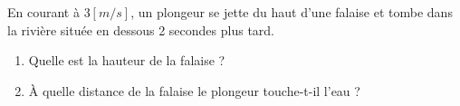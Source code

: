 \begin{exercise}
    En courant à \(3\unit{[m/s]}\), un plongeur se jette du haut d'une falaise et tombe dans la rivière située en dessous 2 secondes plus tard.
    \begin{enumerate}[label=\alph*)]
        \item Quelle est la hauteur de la falaise ?
        \item À quelle distance de la falaise le plongeur touche-t-il l'eau ?
    \end{enumerate}
\end{exercise}

\begin{exercise}
\end{exercise}